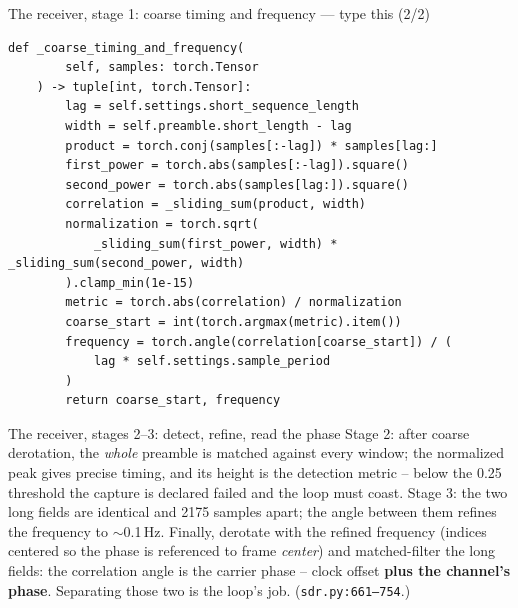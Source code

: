 \documentclass[10pt]{beamer}
\begin{document}
\begin{frame}[fragile]{The receiver, stage 1: coarse timing and frequency --- type this (2/2)}
\begin{lstlisting}[basicstyle=\ttfamily\tiny]
    def _coarse_timing_and_frequency(
        self, samples: torch.Tensor
    ) -> tuple[int, torch.Tensor]:
        lag = self.settings.short_sequence_length
        width = self.preamble.short_length - lag
        product = torch.conj(samples[:-lag]) * samples[lag:]
        first_power = torch.abs(samples[:-lag]).square()
        second_power = torch.abs(samples[lag:]).square()
        correlation = _sliding_sum(product, width)
        normalization = torch.sqrt(
            _sliding_sum(first_power, width) * _sliding_sum(second_power, width)
        ).clamp_min(1e-15)
        metric = torch.abs(correlation) / normalization
        coarse_start = int(torch.argmax(metric).item())
        frequency = torch.angle(correlation[coarse_start]) / (
            lag * self.settings.sample_period
        )
        return coarse_start, frequency
\end{lstlisting}
\end{frame}

\begin{frame}{The receiver, stages 2--3: detect, refine, read the phase}
  Stage 2: after coarse derotation, the \emph{whole} preamble
  is matched against every window; the normalized peak gives
  precise timing, and its height is the detection metric --
  below the 0.25 threshold the capture is declared failed and
  the loop must coast. Stage 3: the two long fields are
  identical and 2175 samples apart; the angle between them
  refines the frequency to $\sim$0.1\,Hz. Finally, derotate
  with the refined frequency (indices centered so the phase is
  referenced to frame \emph{center}) and matched-filter the
  long fields: the correlation angle is the carrier phase --
  clock offset \textbf{plus the channel's phase}. Separating
  those two is the loop's job. (\texttt{sdr.py:661--754}.)
\end{frame}
\end{document}
